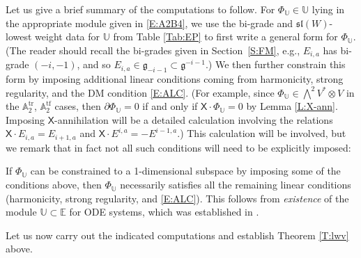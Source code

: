 \documentclass[pdftex]{sigma}%
\DeclareMathOperator{\tf}{tf}
\DeclareMathOperator{\tr}{tr}
\newcommand\fg{\mathfrak{g}}
\newcommand\fsl{\mathfrak{sl}}
\newcommand\bbE{\mathbb{E}}
\newcommand\bbU{\mathbb{U}}
\newcommand\bbA{\mathbb{A}}
\newcommand\sfX{\mathsf{X}}
\numberwithin{equation}{section}
\begin{document}
Let us give a brief summary of the computations to follow. For $\Phi_\bbU \in \bbU$ lying in the appropriate module given in \eqref{E:A2B4}, we use the bi-grade and $\fsl(W)$-lowest weight data for $\bbU$ from Table \ref{Tab:EP} to first write a general form for $\Phi_\bbU$. (The reader should recall the bi-grades given in Section~\ref{S:FM}, e.g., $E_{i,a}$ has bi-grade $(-i,-1)$, and so $E_{i,a} \in \fg_{-i-1} \subset \fg^{-i-1}$.) We then further constrain this form by imposing additional linear conditions coming from harmonicity, strong regularity, and the DM condition \eqref{E:ALC}. (For example, since $\Phi_\bbU \in \bigwedge^2 V^* \otimes V$ in the $\bbA_2^{\tr}$, $\bbA_2^{\tf}$ cases, then $\partial \Phi_\bbU = 0$ if and only if $\sfX \cdot \Phi_\bbU = 0$ by Lemma \ref{L:X-ann}. Imposing $\sfX$-annihilation will be a detailed calculation involving the relations $\sfX \cdot E_{i,a} = E_{i+1,a}$ and $\sfX \cdot E^{i,a} = -E^{i-1,a}$.) This calculation will be involved, but we remark that in fact not all such conditions will need to be explicitly imposed:

\begin{Remark}\label{R:NS}
If $\Phi_\bbU$ can be constrained to a 1-dimensional subspace by imposing some of the conditions above, then $\Phi_\bbU$ necessarily satisfies all the remaining linear conditions (harmonicity, strong regularity, and \eqref{E:ALC}). This follows from {\em existence} of the module $\bbU \subset \bbE$ for ODE systems, which was established in \cite{DM2014, Medvedev2010}.
\end{Remark}

Let us now carry out the indicated computations and establish Theorem \ref{T:lwv} above.
\end{document}
